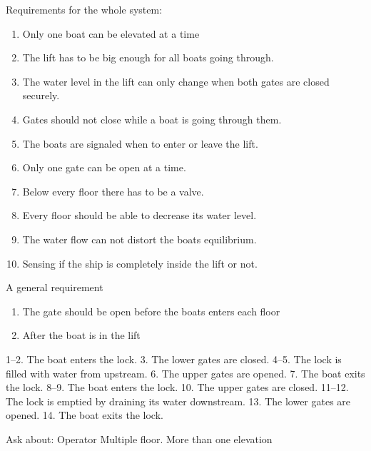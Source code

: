 \documentclass{article}
\begin{document}
Requirements for the whole system:
\begin{enumerate}
	\item Only one boat can be elevated at a time
	\item The lift has to be big enough for all boats going through.
	\item The water level in the lift can only change when both gates are closed securely.
	\item Gates should not close while a boat is going through them.
	\item The boats are signaled when to enter or leave the lift.
	\item Only one gate can be open at a time.
	\item Below every floor there has to be a valve.
	\item Every floor should be able to decrease its water level.
	\item The water flow can not distort the boats equilibrium.
	\item Sensing if the ship is completely inside the lift or not.
	
	
\end{enumerate}

A general requirement

\begin{enumerate}
	\item The gate should be open before the boats enters each floor
	\item After the boat is in the lift
\end{enumerate}

1–2. 	The boat enters the lock. 	
3. 		The lower gates are closed. 
4–5. 	The lock is filled with water from upstream. 	
6. 		The upper gates are opened. 	
7. 		The boat exits the lock. 	
8–9. 	The boat enters the lock.
10. 	The upper gates are closed.
11–12. 	The lock is emptied by draining its water downstream.
13. 	The lower gates are opened.
14. 	The boat exits the lock.
\pagebreak

Ask about:
Operator
Multiple floor.  More than one elevation 
\end{document}
